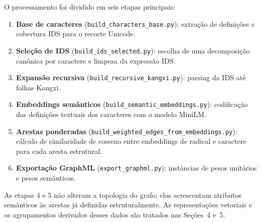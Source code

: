 \documentclass[10pt, a4paper, titlepage]{extarticle}
\begin{document}
O processamento foi dividido em seis etapas principais:

\begin{enumerate}
    \item \textbf{Base de caracteres} (\texttt{build\_characters\_base.py}): extração de definições e cobertura IDS para o recorte Unicode.
    \item \textbf{Seleção de IDS} (\texttt{build\_ids\_selected.py}): escolha de uma decomposição canônica por caractere e limpeza da expressão IDS.
    \item \textbf{Expansão recursiva} (\texttt{build\_recursive\_kangxi.py}): parsing da IDS até folhas Kangxi.
    \item \textbf{Embeddings semânticos} (\texttt{build\_semantic\_embeddings.py}): codificação das definições textuais dos caracteres com o modelo MiniLM.
    \item \textbf{Arestas ponderadas} (\texttt{build\_weighted\_edges\_from\_embeddings.py}): cálculo de similaridade de cosseno entre embeddings de radical e caractere para cada aresta estrutural.
    \item \textbf{Exportação GraphML} (\texttt{export\_graphml.py}): instâncias de pesos unitários e pesos semânticos.
\end{enumerate}

As etapas 4 e 5 não alteram a topologia do grafo; elas acrescentam atributos semânticos às arestas já definidas estruturalmente. As representações vetoriais e os agrupamentos derivados desses dados são tratados nas Seções~4 e~5.
\end{document}
